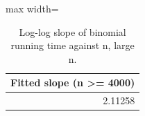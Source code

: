 \begin{table}
\centering
\small
\caption{Log-log slope of binomial running time against n, large n.}
\label{tab:e10_slope}
\begin{adjustbox}{max width=\textwidth}
\begin{tabular}{r}
\toprule
Fitted slope (n >= 4000) \\
\midrule
2.11258 \\
\bottomrule
\end{tabular}
\end{adjustbox}
\end{table}
